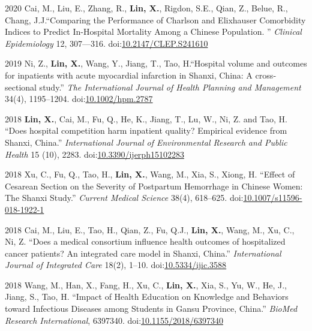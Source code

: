 \documentclass[12pt,letterpaper]{report}
\begin{document}
    \begin{tablist}
    	
    	\item[2020] \tab Cai, M., Liu, E., Zhang, R., \textbf{Lin, X.},  Rigdon, S.E., Qian, Z., Belue, R., Chang, J.J.\enquote{Comparing the Performance of Charlson and Elixhauser Comorbidity Indices to Predict In-Hospital Mortality Among a Chinese Population. } \textit{Clinical Epidemiology} 12, 307—316. doi:\href{https://doi.org/10.2147/CLEP.S241610}{10.2147/CLEP.S241610}
    	
    	\item[2019] \tab Ni, Z.,  \textbf{Lin, X.}, Wang, Y., Jiang, T., Tao, H.\enquote{Hospital volume and outcomes for inpatients with acute myocardial infarction in Shanxi, China: A cross‐sectional study.} \textit{The International Journal of Health Planning and Management} 34(4), 1195–1204. doi:\href{https://doi.org/10.1002/hpm.2787}{10.1002/hpm.2787}
    	
    	\item[2018] \tab \textbf{Lin, X.}, Cai, M., Fu, Q., He, K., Jiang, T., Lu, W., Ni, Z. and Tao, H. \enquote{Does hospital competition harm inpatient quality? Empirical evidence from Shanxi, China.} \textit{International Journal of Environmental Research and Public Health} 15 (10), 2283. doi:\href{https://doi.org/10.3390/ijerph15102283}{10.3390/ijerph15102283}
    	
    	\item[2018] \tab Xu, C., Fu, Q., Tao, H., \textbf{Lin, X.}, Wang, M., Xia, S., Xiong, H. \enquote{Effect of Cesarean Section on the Severity of Postpartum Hemorrhage in Chinese Women: The Shanxi Study.} \textit{Current Medical Science} 38(4), 618–625. doi:\href{https://doi.org/10.1007/s11596-018-1922-1}{10.1007/s11596-018-1922-1}
    	
    	 \item[2018] \tab Cai, M., Liu, E., Tao, H., Qian, Z., Fu, Q.J., \textbf{Lin, X.}, Wang, M., Xu, C., Ni, Z. \enquote{Does a medical consortium influence health outcomes of hospitalized cancer patients? An integrated care model in Shanxi, China.} \textit{International Journal of Integrated Care}  18(2), 1–10. doi:\href{https://doi.org/10.5334/ijic.3588}{10.5334/ijic.3588}
    	 
		\item[2018] \tab Wang, M., Han, X., Fang, H., Xu, C., \textbf{Lin, X.}, Xia, S., Yu, W., He, J., Jiang, S., Tao, H. \enquote{Impact of Health Education on Knowledge and Behaviors toward Infectious Diseases among Students in Gansu Province, China.} \textit{BioMed Research International}, 6397340. doi:\href{https://doi.org/10.1155/2018/6397340}{10.1155/2018/6397340}
		

\end{tablist}
\end{document}
